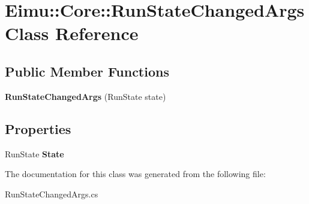 \hypertarget{class_eimu_1_1_core_1_1_run_state_changed_args}{
\section{Eimu::Core::RunStateChangedArgs Class Reference}
\label{class_eimu_1_1_core_1_1_run_state_changed_args}
}
\subsection*{Public Member Functions}
\begin{DoxyCompactItemize}
\item 
\hypertarget{class_eimu_1_1_core_1_1_run_state_changed_args_a4b9e964c3d5fa404bd4b51c0fd35ef42}{
{\bfseries RunStateChangedArgs} (RunState state)}
\label{class_eimu_1_1_core_1_1_run_state_changed_args_a4b9e964c3d5fa404bd4b51c0fd35ef42}

\end{DoxyCompactItemize}
\subsection*{Properties}
\begin{DoxyCompactItemize}
\item 
\hypertarget{class_eimu_1_1_core_1_1_run_state_changed_args_a7e21c225f9276ab3912c2fbe35e4a7a8}{
RunState {\bfseries State}}
\label{class_eimu_1_1_core_1_1_run_state_changed_args_a7e21c225f9276ab3912c2fbe35e4a7a8}

\end{DoxyCompactItemize}


The documentation for this class was generated from the following file:\begin{DoxyCompactItemize}
\item 
RunStateChangedArgs.cs\end{DoxyCompactItemize}
